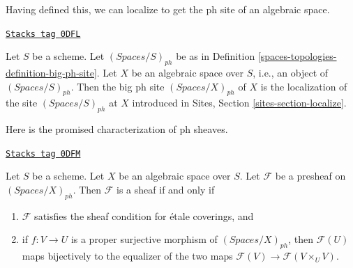 Having defined this, we can localize to get the ph
site of an algebraic space.

\begin{definition}
\label{spaces-topologies-definition-big-small-ph}
\href{https://stacks.math.columbia.edu/tag/0DFL}{\texttt{Stacks tag 0DFL}}

Let $S$ be a scheme. Let $(\textit{Spaces}/S)_{ph}$ be as in
Definition \ref{spaces-topologies-definition-big-ph-site}.
Let $X$ be an algebraic space over $S$, i.e., an object of
$(\textit{Spaces}/S)_{ph}$. Then the big ph site
{\it $(\textit{Spaces}/X)_{ph}$} of $X$
is the localization of the site $(\textit{Spaces}/S)_{ph}$
at $X$ introduced in Sites, Section \ref{sites-section-localize}.
\end{definition}

Here is the promised characterization of ph sheaves.

\begin{lemma}
\label{spaces-topologies-lemma-characterize-sheaf}
\href{https://stacks.math.columbia.edu/tag/0DFM}{\texttt{Stacks tag 0DFM}}

Let $S$ be a scheme. Let $X$ be an algebraic space over $S$.
Let $\mathcal{F}$ be a presheaf on $(\textit{Spaces}/X)_{ph}$.
Then $\mathcal{F}$ is a sheaf if and only if
\begin{enumerate}
\item $\mathcal{F}$ satisfies the sheaf condition for \'etale coverings, and
\item if $f : V \to U$ is a proper surjective morphism of
$(\textit{Spaces}/X)_{ph}$, then
$\mathcal{F}(U)$ maps bijectively to the equalizer
of the two maps $\mathcal{F}(V) \to \mathcal{F}(V \times_U V)$.
\end{enumerate}
\end{lemma}

